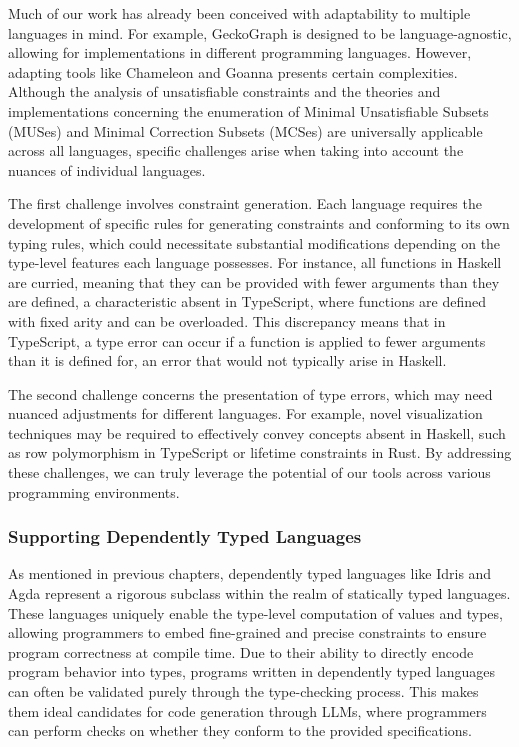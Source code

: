 Much of our work has already been conceived with adaptability to multiple languages in mind. For example, GeckoGraph is designed to be language-agnostic, allowing for implementations in different programming languages. However, adapting tools like Chameleon and Goanna presents certain complexities. Although the analysis of unsatisfiable constraints and the theories and implementations concerning the enumeration of Minimal Unsatisfiable Subsets (MUSes) and Minimal Correction Subsets (MCSes) are universally applicable across all languages, specific challenges arise when taking into account the nuances of individual languages.

The first challenge involves constraint generation. Each language requires the development of specific rules for generating constraints and conforming to its own typing rules, which could necessitate substantial modifications depending on the type-level features each language possesses. For instance, all functions in Haskell are curried, meaning that they can be provided with fewer arguments than they are defined, a characteristic absent in TypeScript, where functions are defined with fixed arity and can be overloaded. This discrepancy means that in TypeScript, a type error can occur if a function is applied to fewer arguments than it is defined for, an error that would not typically arise in Haskell.

The second challenge concerns the presentation of type errors, which may need nuanced adjustments for different languages. For example, novel visualization techniques may be required to effectively convey concepts absent in Haskell, such as row polymorphism in TypeScript or lifetime constraints in Rust. By addressing these challenges, we can truly leverage the potential of our tools across various programming environments.

\subsubsection{Supporting Dependently Typed Languages}

As mentioned in previous chapters, dependently typed languages like Idris and Agda represent a rigorous subclass within the realm of statically typed languages. These languages uniquely enable the type-level computation of values and types, allowing programmers to embed fine-grained and precise constraints to ensure program correctness at compile time. Due to their ability to directly encode program behavior into types, programs written in dependently typed languages can often be validated purely through the type-checking process. This makes them ideal candidates for code generation through LLMs, where programmers can perform checks on whether they conform to the provided specifications. 

